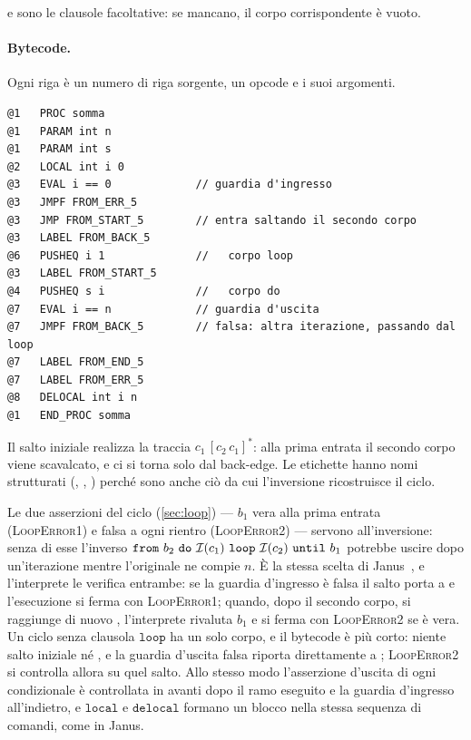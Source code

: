 \noindent
{} e  sono le clausole facoltative: se mancano,
il corpo corrispondente è vuoto.

\paragraph{Bytecode.} Ogni riga è un numero di riga sorgente, un opcode e i suoi
argomenti.

\begin{lstlisting}
@1   PROC somma
@1   PARAM int n
@1   PARAM int s
@2   LOCAL int i 0
@3   EVAL i == 0             // guardia d'ingresso
@3   JMPF FROM_ERR_5
@3   JMP FROM_START_5        // entra saltando il secondo corpo
@3   LABEL FROM_BACK_5
@6   PUSHEQ i 1              //   corpo loop
@3   LABEL FROM_START_5
@4   PUSHEQ s i              //   corpo do
@7   EVAL i == n             // guardia d'uscita
@7   JMPF FROM_BACK_5        // falsa: altra iterazione, passando dal loop
@7   LABEL FROM_END_5
@7   LABEL FROM_ERR_5
@8   DELOCAL int i n
@1   END_PROC somma
\end{lstlisting}

\noindent
Il salto iniziale realizza la traccia $c_1\,[c_2\,c_1]^{*}$: alla prima entrata
il secondo corpo viene scavalcato, e ci si torna solo dal back-edge. Le
etichette hanno nomi strutturati (, ,
) perché sono anche ciò da cui l'inversione ricostruisce il
ciclo.

Le due asserzioni del ciclo (\cref{sec:loop}) --- $b_1$ vera alla prima entrata
(\textsc{LoopError1}) e falsa a ogni rientro (\textsc{LoopError2}) --- servono
all'inversione: senza di esse l'inverso $\mathtt{from}\ b_2\ \mathtt{do}\
\mathcal{I}(c_1)\ \mathtt{loop}\ \mathcal{I}(c_2)\ \mathtt{until}\ b_1$ potrebbe uscire dopo
un'iterazione mentre l'originale ne compie $n$. È la stessa scelta di
Janus~\cite{YokoyamaGluck2007}, e l'interprete le verifica entrambe: se la
guardia d'ingresso è falsa il salto porta a \code{FROM\_ERR} e l'esecuzione si
ferma con \textsc{LoopError1}; quando, dopo il secondo corpo, si raggiunge di
nuovo \code{FROM\_START}, l'interprete rivaluta $b_1$ e si ferma con
\textsc{LoopError2} se è vera. Un ciclo senza clausola $\mathtt{loop}$ ha
un solo corpo, e il bytecode è più corto: niente salto iniziale né
\code{FROM\_BACK}, e la guardia d'uscita falsa riporta direttamente a
\code{FROM\_START}; \textsc{LoopError2} si controlla allora su quel salto.
Allo stesso modo l'asserzione d'uscita di ogni
condizionale è controllata in avanti dopo il ramo eseguito e la guardia
d'ingresso all'indietro, e $\mathtt{local}$ e $\mathtt{delocal}$ formano un
blocco nella stessa sequenza di comandi, come in Janus.

